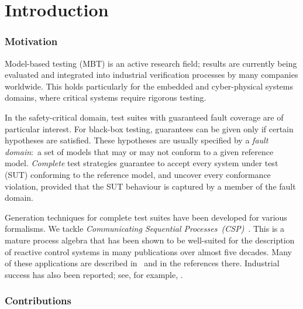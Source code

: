 
\section{Introduction}
\label{sec:intro}


\subsubsection*{Motivation}

Model-based testing (MBT) is an active research field; results are currently
being evaluated and integrated into industrial verification processes by many
companies worldwide. This holds particularly for the embedded and
cyber-physical systems domains, where critical systems require rigorous
testing.

In the safety-critical domain, test suites with guaranteed fault coverage are
of particular interest. For black-box testing, guarantees can be given only
if certain hypotheses are satisfied. These hypotheses are usually specified
by a \emph{fault domain}:~a set of models that may or may not conform to a
given reference model. \emph{Complete} test strategies guarantee to accept
every  system under test (SUT) conforming to the reference model, and uncover
every conformance violation, provided that the SUT behaviour is captured by a
member of the fault domain.

Generation techniques for complete test suites have been developed for
various formalisms. We tackle \emph{Communicating Sequential
Processes~(CSP)}~\cite{Hoare:1985:CSP:3921,Roscoe2010}. This is a mature
process algebra that has been shown to be well-suited for the description of
reactive control systems in many publications over almost five decades. Many
of these applications are described in~\cite{Roscoe2010} and in the
references there. Industrial success has also been reported; see, for
example, \cite{976937,DBLP:conf/prdc/ShiPK99,DBLP:conf/amast/ButhKPS97}.


\subsubsection*{Contributions}

